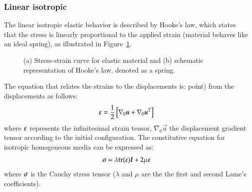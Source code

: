 \subsubsection{Linear isotropic}

The linear isotropic elastic behavior is described by Hooke's law, which states
that the stress is linearly proportional to the applied strain (material behaves
like an ideal spring), as illustrated in Figure~\ref{fig:smm:cl:elastic}.
\begin{figure}[!htb]
  \begin{center}

    \hspace{0.05\textwidth} 
    \caption{(a) Stress-strain curve for elastic material and (b)
      schematic representation of Hooke's law, denoted as a spring.}
    \label{fig:smm:cl:elastic}
  \end{center}
\end{figure}
The equation that relates the strains to the
displacements is: %
point) from the displacements as follows:
\begin{equation}
  \label{eqn:smm:strain_inf}
  \boldsymbol{\varepsilon} =
  \frac{1}{2} \left[ \nabla_0 \boldsymbol{u}+\nabla_0 \boldsymbol{u}^T \right]
\end{equation}
where $\boldsymbol{\varepsilon}$ represents the infinitesimal strain tensor,
$\nabla_{0}\vec{u}$ the displacement gradient
tensor according to the initial configuration. The constitutive equation
for isotropic homogeneous media can be expressed as:
\begin{equation}
  \label{eqn:smm:material:constitutive_elastic}
  \boldsymbol{\sigma } =\lambda\mathrm{tr}(\boldsymbol{\varepsilon})\boldsymbol{I}+2 \mu\boldsymbol{\varepsilon}
\end{equation}
where $\boldsymbol{\sigma}$ is the Cauchy stress tensor
($\lambda$ and $\mu$ are the the first and second Lame's
coefficients).

